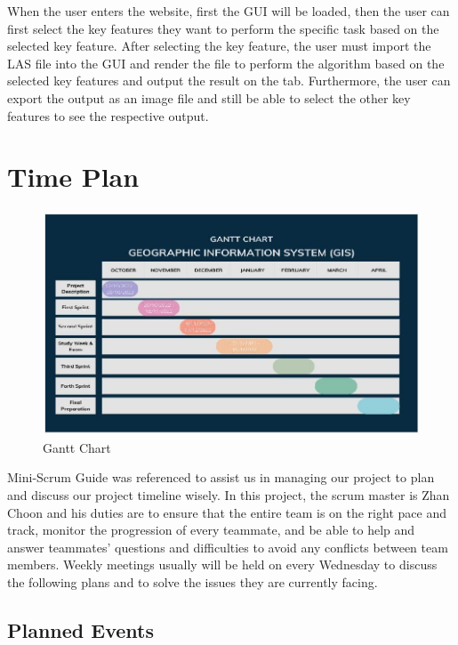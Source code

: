 \documentclass[a4paper, 12pt]{article}
\begin{document}
When the user enters the website, first the GUI will be loaded, then the user can first select the key features they want to perform the specific task based on the selected key feature. After selecting the key feature, the user must import the LAS file into the GUI and render the file to perform the algorithm based on the selected key features and output the result on the tab. Furthermore, the user can export the output as an image file and still be able to select the other key features to see the respective output.

\section{Time Plan}

\begin{figure}[H]
    \centering
    \includegraphics[width=\textwidth]{Images/05.png}
    \caption{Gantt Chart}
    \label{fig:4}
\end{figure}

Mini-Scrum Guide was referenced to assist us in managing our project to plan and discuss our project timeline wisely. In this project, the scrum master is Zhan Choon and his duties are to ensure that the entire team is on the right pace and track, monitor the progression of every teammate, and be able to help and answer teammates’ questions and difficulties to avoid any conflicts between team members. Weekly meetings usually will be held on every Wednesday to discuss the following plans and to solve the issues they are currently facing.

\subsection{Planned Events}
\end{document}

